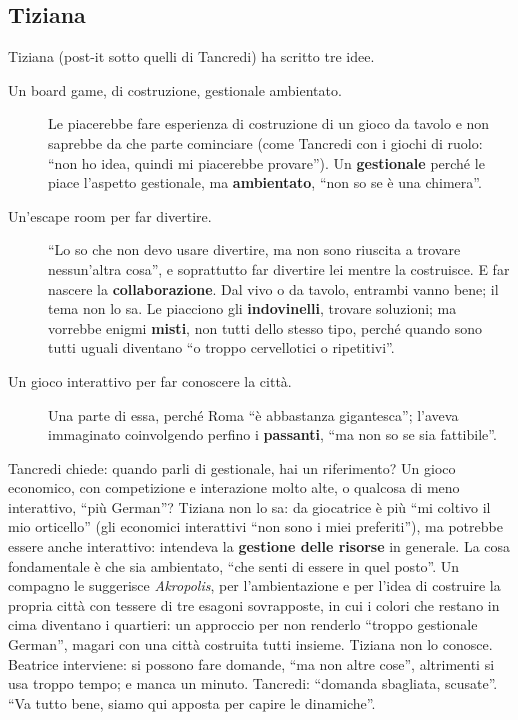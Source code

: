 \subsection{Tiziana}
\label{a7:sec:idee-tiziana}

Tiziana (post-it sotto quelli di Tancredi) ha scritto tre idee.
\begin{description}
  \item[Un board game, di costruzione, gestionale ambientato.] Le piacerebbe fare
        esperienza di costruzione di un gioco da tavolo e non saprebbe da che parte
        cominciare (come Tancredi con i giochi di ruolo: ``non ho idea, quindi mi
        piacerebbe provare''). Un \textbf{gestionale} perché le piace l'aspetto
        gestionale, ma \textbf{ambientato}, ``non so se è una chimera''.
  \item[Un'escape room per far divertire.] ``Lo so che non devo usare divertire, ma
        non sono riuscita a trovare nessun'altra cosa'', e soprattutto far divertire
        lei mentre la costruisce. E far nascere la \textbf{collaborazione}. Dal vivo o
        da tavolo, entrambi vanno bene; il tema non lo sa. Le piacciono gli
        \textbf{indovinelli}, trovare soluzioni; ma vorrebbe enigmi \textbf{misti}, non
        tutti dello stesso tipo, perché quando sono tutti uguali diventano ``o troppo
        cervellotici o ripetitivi''.
  \item[Un gioco interattivo per far conoscere la città.] Una parte di essa, perché
        Roma ``è abbastanza gigantesca''; l'aveva immaginato coinvolgendo perfino i
        \textbf{passanti}, ``ma non so se sia fattibile''.
\end{description}
Tancredi chiede: quando parli di gestionale, hai un riferimento? Un gioco economico,
con competizione e interazione molto alte, o qualcosa di meno interattivo,
``più German''? Tiziana non lo sa: da giocatrice è più ``mi coltivo il mio orticello''
(gli economici interattivi ``non sono i miei preferiti''), ma potrebbe essere anche
interattivo: intendeva la \textbf{gestione delle risorse} in generale. La cosa
fondamentale è che sia ambientato, ``che senti di essere in quel posto''. Un
compagno le suggerisce \emph{Akropolis}, per l'ambientazione e per l'idea di
costruire la propria città con tessere di tre esagoni sovrapposte, in cui i colori che
restano in cima diventano i quartieri: un approccio per non renderlo ``troppo
gestionale German'', magari con una città costruita tutti insieme. Tiziana non lo
conosce. Beatrice interviene: si possono fare domande, ``ma non altre cose'',
altrimenti si usa troppo tempo; e manca un minuto. Tancredi: ``domanda sbagliata,
scusate''. ``Va tutto bene, siamo qui apposta per capire le dinamiche''.

